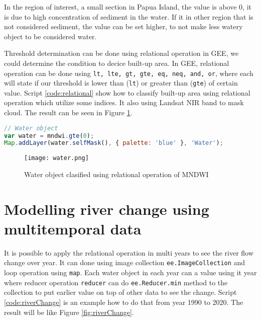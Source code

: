 In the region of interest, a small section in Papua Island, the value is above 0, it is due to high concentration of sediment in the water. If it in other region that is not considered sediment, the value can be set higher, to not make less watery object to be considered water.

Threshold determination can be done using relational operation in GEE, we could determine the condition to decice built-up area. In GEE, relational operation can be done using \verb|lt, lte, gt, gte, eq, neq, and, or|, where each will state if our threshold is lower than (\verb|lt|) or greater than (\verb|gte|) of certain value. Script \ref{code:relational} show how to classify built-up area using relational operation which utilize some indices. It also using Landsat NIR band to mask cloud. The result can be seen in Figure \ref{fig:water}.

\begin{lstlisting}[language=JavaScript, label={code:relational}, caption={GEE Script to Classify Water using Relational Operation}]
// Water object
var water = mndwi.gte(0);
Map.addLayer(water.selfMask(), { palette: 'blue' }, 'Water');
\end{lstlisting}

\begin{figure}[htbp]
	\label{fig:water}
	\centering
	\texttt{[image: water.png]}
	\caption{Water object clasified using relational operation of MNDWI}
\end{figure}

\section{Modelling river change using multitemporal data}
It is possible to apply the relational operation in multi years to see the river flow change over year. It can done using image collection \verb|ee.ImageCollection| and loop operation using \verb|map|. Each water object in each year can a value using it year where reducer operation \verb|reducer| can do \verb|ee.Reducer.min| method to the collection to put earlier value on top of other data to see the change. Script \ref{code:riverChange} is an example how to do that from year 1990 to 2020. The result will be like Figure \ref{fig:riverChange}.

